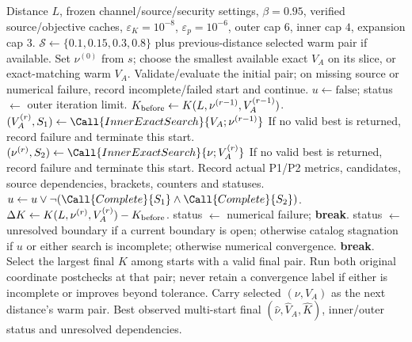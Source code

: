 \begin{algorithm}[t]
\caption{Exact-evaluation alternating search with explicit incomplete status}
\label{alg:exact-ao}
\begin{algorithmic}[1]
\Require Distance $L$, frozen channel/source/security settings, $\beta=0.95$,
verified source/objective caches, $\varepsilon_K=10^{-8}$,
$\varepsilon_p=10^{-6}$, outer cap $6$, inner cap $4$, expansion cap $3$.
\State $\mathcal S\gets\{0.1,0.15,0.3,0.8\}$ plus previous-distance selected warm pair if available.
  \State Set $\nu^{(0)}$ from $s$; choose the smallest available exact $V_A$ on its slice, or exact-matching warm $V_A$.
  \State Validate/evaluate the initial pair; on missing source or numerical failure, record incomplete/failed start and continue.
  \State $u\gets\mathrm{false}$; status $\gets$ outer iteration limit.
    \State $K_{\rm before}\gets K(L,\nu^{(r-1)},V_A^{(r-1)})$.
    \State $(V_A^{(r)},S_1)\gets\Call{InnerExactSearch}{V_A;\nu^{(r-1)}}$ 
    \State If no valid best is returned, record failure and terminate this start.
    \State $(\nu^{(r)},S_2)\gets\Call{InnerExactSearch}{\nu;V_A^{(r)}}$ 
    \State If no valid best is returned, record failure and terminate this start.
    \State Record actual P1/P2 metrics, candidates, source dependencies, brackets, counters and statuses.
    \State $u\gets u\lor\neg(\Call{Complete}{S_1}\land\Call{Complete}{S_2})$.
    \State $\Delta K\gets K(L,\nu^{(r)},V_A^{(r)})-K_{\rm before}$.
      \State status $\gets$ numerical failure; \textbf{break}.
      \State status $\gets$ unresolved boundary if a current boundary is open;
      otherwise catalog stagnation if $u$ or either search is incomplete;
      otherwise numerical convergence. \textbf{break}.
    \EndIf
  \EndFor
\EndFor
\State Select the largest final $K$ among starts with a valid final pair.
\State Run both original coordinate postchecks at that pair; never retain a convergence label if either is incomplete or improves beyond tolerance.
\State Carry selected $(\nu,V_A)$ as the next distance's warm pair.
\Ensure Best observed multi-start final $(\widehat\nu,\widehat V_A,\widehat K)$, inner/outer status and unresolved dependencies.

\end{algorithmic}
\end{algorithm}
